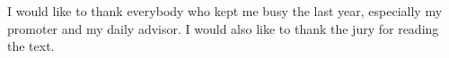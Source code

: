 \documentclass[master=eelt,masteroption=ei]{kulemt}
\begin{document}
\begin{preface}
  I would like to thank everybody who kept me busy the last year,
  especially my promoter and my daily advisor. I would also like to thank the
  jury for reading the text.
\end{preface}

\tableofcontents*

\begin{abstract}
\end{abstract}

\mainmatter








% 
\clearpage

\printglossary[type=\acronymtype]


\backmatter



\end{document}
